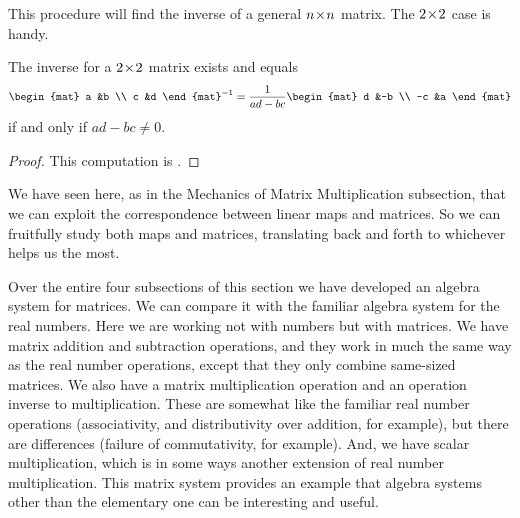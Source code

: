 This procedure will find the inverse of a general $n \! \times \! n$ matrix.
The $2 \! \times \! 2$ case is handy.

\begin{corollary}
\label{cor:TwoByTwoInv}
The inverse for a \( 2 \! \times \! 2 \) matrix exists and equals
\begin{equation*}
  \begin{mat}
    a  &b  \\
    c  &d
  \end{mat}^{-1}
  =
  \frac{1}{ad-bc}
  \begin{mat}
    d  &-b \\
   -c  &a
  \end{mat}
\end{equation*}
if and only if \( ad-bc\neq 0 \).
\end{corollary}
\begin{proof}
This computation is 
. 
\end{proof}

We have seen here, as in the Mechanics of Matrix Multiplication subsection,
that we can exploit the correspondence between
linear maps and matrices.
So we can fruitfully study both maps and matrices, translating back and forth
to whichever helps us the most.

Over the entire four subsections of 
this section we have developed an algebra system for matrices.
We can compare it with the familiar algebra system for the real numbers.
Here we are working not with numbers but with matrices.
We have matrix addition and subtraction operations, 
and they work in much the same
way as the real number operations, except that they only combine same-sized
matrices.
We also have a matrix multiplication operation 
and an operation inverse to multiplication.
These are somewhat like the familiar real number operations
(associativity, and distributivity over addition, for example), but
there are differences (failure of commutativity, for example). 
And, we have scalar multiplication, which is in some ways another extension
of real number multiplication.
This matrix system provides an example that algebra
systems other than the 
elementary one can be interesting and useful.


